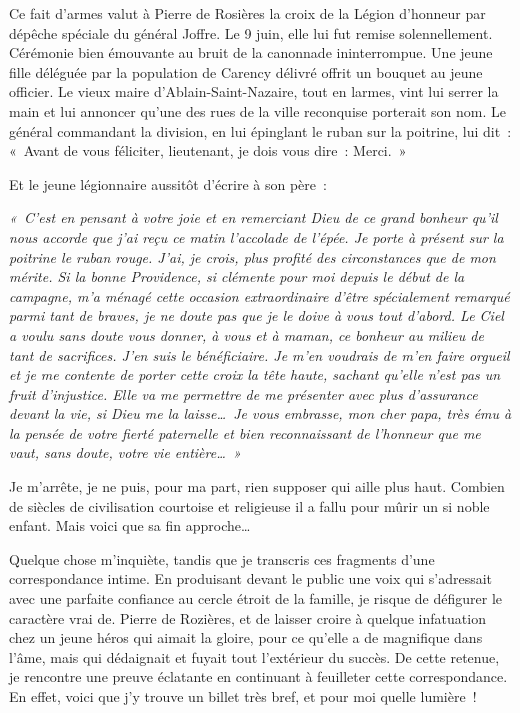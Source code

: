 \documentclass[french,twoside]{book} %
\begin{document}
\noindent Ce fait d’armes valut à Pierre de Rosières la croix de la Légion d’honneur par dépêche spéciale du général Joffre. Le 9 juin, elle lui fut remise solennellement. Cérémonie bien émouvante au bruit de la canonnade ininterrompue. Une jeune fille déléguée par la population de Carency délivré offrit un bouquet au jeune officier. Le vieux maire d’Ablain-Saint-Nazaire, tout en larmes, vint lui serrer la main et lui annoncer qu’une des rues de la ville reconquise porterait son nom. Le général commandant la division, en lui épinglant le ruban sur la poitrine, lui dit : « Avant de vous féliciter, lieutenant, je dois vous dire : Merci. »‌\par
Et le jeune légionnaire aussitôt d’écrire à son père :‌\par
{\itshape « C’est en pensant à votre joie et en remerciant Dieu de ce grand bonheur qu’il nous accorde que j’ai reçu ce matin l’accolade de l’épée. Je porte à présent sur la poitrine le ruban rouge. J’ai, je crois, plus profité des circonstances que de mon mérite. Si la bonne Providence, si clémente pour moi depuis le début de la campagne, m’a ménagé cette occasion extraordinaire d’être spécialement remarqué parmi tant de braves, je ne doute pas que je le doive à vous tout d’abord. Le Ciel a voulu sans doute vous donner, à vous et à maman, ce bonheur au milieu de tant de sacrifices. J’en suis le bénéficiaire. Je m’en voudrais de m’en faire orgueil et je me contente de porter cette croix la tête haute, sachant qu’elle n’est pas un fruit d’injustice. Elle va me permettre de me présenter avec plus d’assurance devant la vie, si Dieu me la laisse… Je vous embrasse, mon cher papa, très ému à la pensée de votre fierté paternelle et bien reconnaissant de l’honneur que me vaut, sans doute, votre vie entière… »}\par
Je m’arrête, je ne puis, pour ma part, rien supposer qui aille plus haut. Combien de siècles de civilisation courtoise et religieuse il a fallu pour mûrir un si noble enfant. Mais voici que sa fin approche… ‌\par
Quelque chose m’inquiète, tandis que je transcris ces fragments d’une correspondance intime. En produisant devant le public une voix qui s’adressait avec une parfaite confiance au cercle étroit de la famille, je risque de défigurer le caractère vrai de. Pierre de Rozières, et de laisser croire à quelque infatuation chez un jeune héros qui aimait la gloire, pour ce qu’elle a de magnifique dans l’âme, mais qui dédaignait et fuyait tout l’extérieur du succès. De cette retenue, je rencontre une preuve éclatante en continuant à feuilleter cette correspondance. En effet, voici que j’y trouve un billet très bref, et pour moi quelle lumière !‌\par
\end{document}
